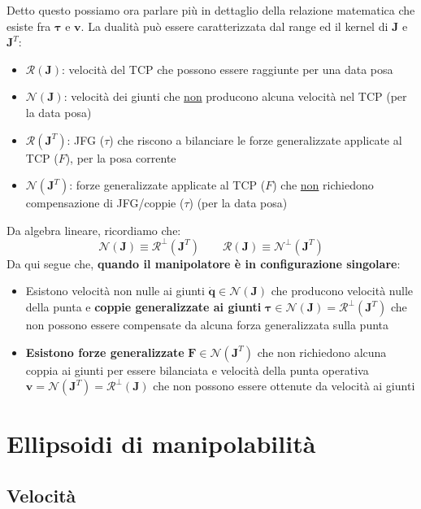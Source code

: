 Detto questo possiamo ora parlare più in dettaglio della relazione matematica che esiste fra $\bm{\tau}$ e $\bm{v}$. La dualità può essere caratterizzata dal range ed il kernel di $\bm{J}$ e $\bm{J}^T$:
\begin{itemize}
	\item $\mathcal{R}(\bm{J})$: velocità del TCP che possono essere raggiunte per una data posa
	\item $\mathcal{N}(\bm{J})$: velocità dei giunti che \underline{non} producono alcuna velocità nel TCP (per la data posa)
	\item $\mathcal{R}(\bm{J}^T)$: JFG ($\tau$) che riscono a bilanciare le forze generalizzate applicate al TCP ($F$), per la posa corrente
	\item $\mathcal{N}(\bm{J}^T)$: forze generalizzate applicate al TCP ($F$) che \underline{non} richiedono compensazione di JFG/coppie ($\tau$) (per la data posa)
\end{itemize}
Da algebra lineare, ricordiamo che:
$$
\mathcal{N}(\bm{J}) \equiv \mathcal{R}^\perp(\bm{J}^T)
\qquad
\mathcal{R}(\bm{J}) \equiv \mathcal{N}^\perp(\bm{J}^T)
$$
Da qui segue che, \textbf{quando il manipolatore è in configurazione singolare}:
\begin{itemize}
	\item Esistono velocità non nulle ai giunti $\dot{\bm{q}} \in \mathcal{N}(\bm{J})$ che producono velocità nulle della punta e \textbf{coppie generalizzate ai giunti} $\bm{\tau} \in \mathcal{N}(\bm{J}) = \mathcal{R}^\perp(\bm{J}^T)$ che non possono essere compensate da alcuna forza generalizzata sulla punta
	\item \textbf{Esistono forze generalizzate} $\bm{F} \in \mathcal{N}(\bm{J}^T)$ che non richiedono alcuna coppia ai giunti per essere bilanciata e velocità della punta operativa $\bm{v} = \mathcal{N}(\bm{J}^T) = \mathcal{R}^\perp(\bm{J})$ che non possono essere ottenute da velocità ai giunti
\end{itemize}




\section{Ellipsoidi di manipolabilità}

\subsection{Velocità}

